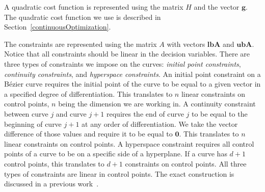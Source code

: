 \documentclass{svproc}
\newcommand{\vg}{\mathbf{g}}
\newcommand{\vzero}{\mathbf{0}}
\newcommand{\vn}{\mathbf{n}}
\newcommand{\vlbA}{\mathbf{lbA}}
\newcommand{\vubA}{\mathbf{ubA}}
\begin{document}
A quadratic cost function is represented using the matrix $H$ and the vector $\vg$. 
The quadratic cost function we use is described in Section~\ref{continuousOptimization}.

The constraints are represented using the matrix $A$ with vectors $\vlbA$ and $\vubA$.
Notice that all constraints should be linear in the decision variables.
There are three types of constraints we impose on the curves: \emph{initial point constraints}, \emph{continuity constraints}, and \emph{hyperspace constraints}.
An initial point constraint on a B\'ezier curve requires the initial point of the curve to be equal to a given vector in a specified degree of differentiation. This translates to $n$ linear constraints on control points, $n$ being the dimension we are working in.
A continuity constraint between curve $j$ and curve $j+1$ requires the end of curve $j$ to be equal to the beginning of curve $j+1$ at any order of differentiation.
We take the vector difference of those values and require it to be equal to $\vzero$. This translates to $n$ linear constraints on control points.
A hyperspace constraint requires all control points of a curve to be on a specific side of a hyperplane. If a curve has $d+1$ control points, this translates to $d+1$ constraints on control points. All three types of constraints are linear in control points. The exact construction is discussed in a previous work~\cite{crazyplanning-ieeetro}.





\end{document}
